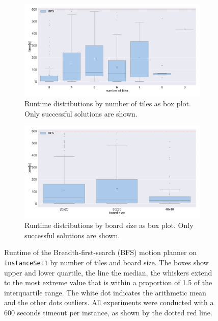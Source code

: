 \begin{figure}[H]
\centering
\begin{subfigure}[b]{\textwidth}
\centering
\includegraphics[width=\textwidth]{figures/plots/heuristic_solvers_i1/bfs_time_over_tiles.pdf}
\caption{Runtime distributions by number of tiles as box plot. Only successful solutions are shown.}
\label{fig:bfs_time_over_tiles}
\end{subfigure}
\begin{subfigure}[b]{\textwidth}
\centering
\includegraphics[width=\textwidth]{figures/plots/heuristic_solvers_i1/bfs_time_over_board_size.pdf}
\caption{Runtime distributions by board size as box plot. Only successful solutions are shown.}
\label{fig:bfs_fraction_solved_over_board_size}
\end{subfigure}
\caption[Runtime of the BFS motion planner on \texttt{InstanceSet1}] {Runtime of the Breadth-first-search (BFS) motion planner on \texttt{InstanceSet1} by number of tiles and board size. The boxes show upper and lower quartile, the line the median, the whiskers extend to the most extreme value that is within a proportion of 1.5 of the interquartile range. The white dot indicates the arithmetic mean and the other dots outliers.
All experiments were conducted with a 600 seconds timeout per instance, as shown by the dotted red line.}
\label{fig:bfs_performance1}
\end{figure}
